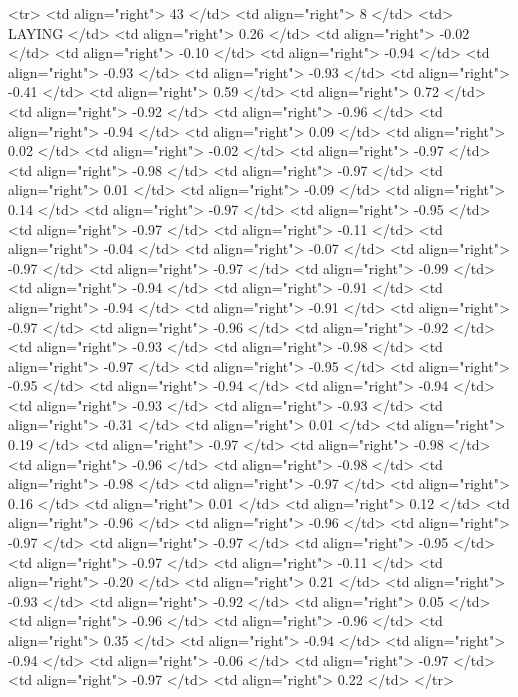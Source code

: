   <tr> <td align="right"> 43 </td> <td align="right">   8 </td> <td> LAYING </td> <td align="right"> 0.26 </td> <td align="right"> -0.02 </td> <td align="right"> -0.10 </td> <td align="right"> -0.94 </td> <td align="right"> -0.93 </td> <td align="right"> -0.93 </td> <td align="right"> -0.41 </td> <td align="right"> 0.59 </td> <td align="right"> 0.72 </td> <td align="right"> -0.92 </td> <td align="right"> -0.96 </td> <td align="right"> -0.94 </td> <td align="right"> 0.09 </td> <td align="right"> 0.02 </td> <td align="right"> -0.02 </td> <td align="right"> -0.97 </td> <td align="right"> -0.98 </td> <td align="right"> -0.97 </td> <td align="right"> 0.01 </td> <td align="right"> -0.09 </td> <td align="right"> 0.14 </td> <td align="right"> -0.97 </td> <td align="right"> -0.95 </td> <td align="right"> -0.97 </td> <td align="right"> -0.11 </td> <td align="right"> -0.04 </td> <td align="right"> -0.07 </td> <td align="right"> -0.97 </td> <td align="right"> -0.97 </td> <td align="right"> -0.99 </td> <td align="right"> -0.94 </td> <td align="right"> -0.91 </td> <td align="right"> -0.94 </td> <td align="right"> -0.91 </td> <td align="right"> -0.97 </td> <td align="right"> -0.96 </td> <td align="right"> -0.92 </td> <td align="right"> -0.93 </td> <td align="right"> -0.98 </td> <td align="right"> -0.97 </td> <td align="right"> -0.95 </td> <td align="right"> -0.95 </td> <td align="right"> -0.94 </td> <td align="right"> -0.94 </td> <td align="right"> -0.93 </td> <td align="right"> -0.93 </td> <td align="right"> -0.31 </td> <td align="right"> 0.01 </td> <td align="right"> 0.19 </td> <td align="right"> -0.97 </td> <td align="right"> -0.98 </td> <td align="right"> -0.96 </td> <td align="right"> -0.98 </td> <td align="right"> -0.98 </td> <td align="right"> -0.97 </td> <td align="right"> 0.16 </td> <td align="right"> 0.01 </td> <td align="right"> 0.12 </td> <td align="right"> -0.96 </td> <td align="right"> -0.96 </td> <td align="right"> -0.97 </td> <td align="right"> -0.97 </td> <td align="right"> -0.95 </td> <td align="right"> -0.97 </td> <td align="right"> -0.11 </td> <td align="right"> -0.20 </td> <td align="right"> 0.21 </td> <td align="right"> -0.93 </td> <td align="right"> -0.92 </td> <td align="right"> 0.05 </td> <td align="right"> -0.96 </td> <td align="right"> -0.96 </td> <td align="right"> 0.35 </td> <td align="right"> -0.94 </td> <td align="right"> -0.94 </td> <td align="right"> -0.06 </td> <td align="right"> -0.97 </td> <td align="right"> -0.97 </td> <td align="right"> 0.22 </td> </tr>
